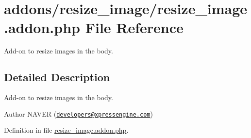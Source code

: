 \hypertarget{resize__image_8addon_8php}{\section{addons/resize\+\_\+image/resize\+\_\+image.addon.\+php File Reference}
\label{resize__image_8addon_8php}
}


Add-\/on to resize images in the body.  




\subsection{Detailed Description}
Add-\/on to resize images in the body. 

\begin{DoxyAuthor}{Author}
N\+A\+V\+E\+R (\href{mailto:developers@xpressengine.com}{\tt developers@xpressengine.\+com}) 
\end{DoxyAuthor}


Definition in file \hyperlink{resize__image_8addon_8php_source}{resize\+\_\+image.\+addon.\+php}.

